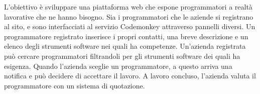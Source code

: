\large
L'obiettivo è sviluppare una piattaforma web che espone programmatori a realtà lavorative che ne hanno bisogno.
Sia i programmatori che le aziende si registrano al sito, e sono interfacciati al servizio Codemonkey attraverso pannelli diversi.
Un programmatore registrato inserisce i propri contatti, una breve descrizione e un elenco degli strumenti software nei quali ha competenze.
Un'azienda registrata può cercare programmatori filtrandoli per gli strumenti software dei quali ha esigenza. Quando l'azienda sceglie un programmatore, a questo arriva una notifica e può decidere di accettare il lavoro.
A lavoro concluso, l'azienda valuta il programmatore con un sistema di quotazione.
